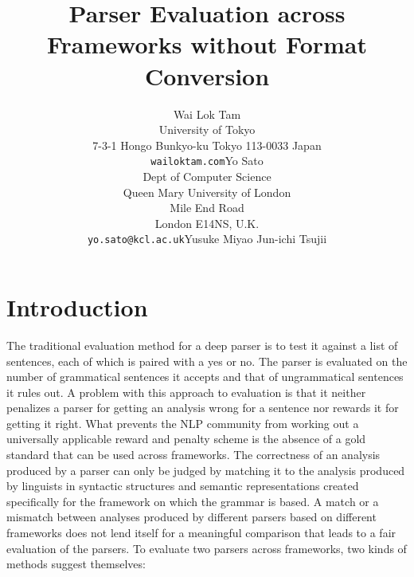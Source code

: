 \documentclass[11pt]{article}
\title{Parser Evaluation across Frameworks without Format Conversion}
\author{Wai Lok Tam\\University of Tokyo\\7-3-1 Hongo Bunkyo-ku Tokyo
113-0033 Japan\\{\tt wailoktam\@yahoo.com}\And Yo Sato\\Dept of Computer Science\\Queen Mary University of London\\Mile End Road\\London E14NS, U.K.\\{\tt yo.sato@kcl.ac.uk}\And Yusuke Miyao \And Jun-ichi Tsujii}
\date{}
\begin{document}
\maketitle

\begin{abstract}
 
\end{abstract}




\section{Introduction}


The traditional evaluation method for a deep parser is to test it against a list of sentences, each of which is paired with a yes or no. The parser is evaluated on the number of  grammatical sentences it accepts and that of ungrammatical sentences it rules out. A problem with this approach to evaluation is that it neither penalizes a parser for getting an analysis wrong for a sentence nor rewards it for getting it right. What prevents the NLP community from working out a universally applicable reward and penalty scheme is the absence of a gold standard that can be used across frameworks. The correctness of an analysis produced by a parser  can only be judged by matching it to the analysis produced by linguists in syntactic structures and semantic representations created specifically for the framework on which the grammar is based. A match or a mismatch between analyses produced by different parsers based on different frameworks does not lend itself for a meaningful comparison that leads to a fair evaluation of the parsers. To evaluate two parsers across frameworks, two kinds of methods suggest themselves:
\end{document}
